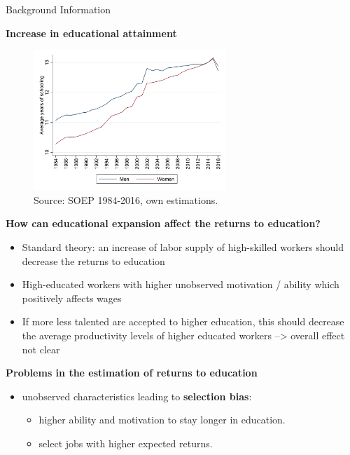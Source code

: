 \documentclass[10pt,ignorenonframetext,]{beamer}
\providecommand{\tightlist}{%
  \setlength{\itemsep}{0pt}\setlength{\parskip}{0pt}}
\begin{document}
\begin{frame}[allowframebreaks]{Background Information}
\protect\hypertarget{background-information}{}

\textbf{Increase in educational attainment}

\begin{figure}
\centering
\includegraphics[width=\textwidth,height=2.08333in]{img/edu_sex.png}
\caption{Source: SOEP 1984-2016, own estimations.}
\end{figure}

\textbf{How can educational expansion affect the returns to education?}

\begin{itemize}
\tightlist
\item
  Standard theory: an increase of labor supply of high-skilled workers
  should decrease the returns to education
\item
  High-educated workers with higher unobserved motivation / ability
  which positively affects wages
\item
  If more less talented are accepted to higher education, this should
  decrease the average productivity levels of higher educated workers
  --\textgreater{} overall effect not clear
\end{itemize}

\textbf{Problems in the estimation of returns to education}

\begin{itemize}
\tightlist
\item
  unobserved characteristics leading to \textbf{selection bias}:

  \begin{itemize}
  \tightlist
  \item
    higher ability and motivation to stay longer in education.
  \item
    select jobs with higher expected returns.
  \end{itemize}
\end{itemize}

\end{frame}
\end{document}
